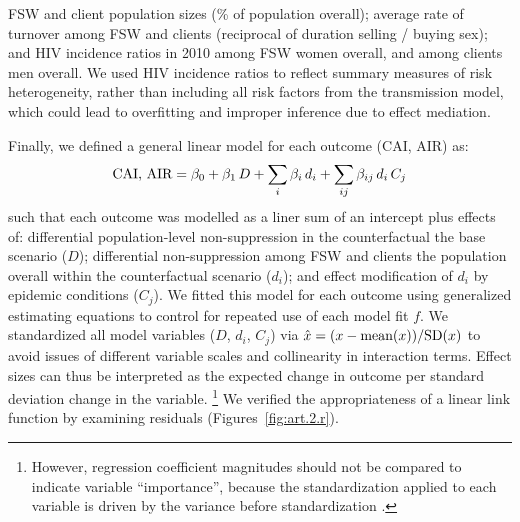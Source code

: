 FSW and client population sizes (\% of population overall);
average rate of turnover among FSW and clients (reciprocal of duration selling / buying sex); and
HIV incidence ratios in 2010 among FSW \vs women overall, and among clients \vs men overall.
We used HIV incidence ratios to reflect summary measures of risk heterogeneity,
rather than including all risk factors from the transmission model,
which could lead to overfitting and improper inference due to effect mediation.
\par
Finally, we defined a general linear model for each outcome (CAI, AIR) as:
\begin{equation}\label{eq:art.2.glm}
  \textnormal{CAI, AIR} = \beta_0
                 + \beta_1\,D
                 + \sum_i \beta_i\,d_i
                 + \sum_{ij} \beta_{ij}\,d_i\,C_j
\end{equation}
such that each outcome was modelled as a liner sum of an intercept plus effects of:
differential population-level non-suppression in the counterfactual \vs the base scenario ($D$);
differential non-suppression among FSW and clients
\vs the population overall within the counterfactual scenario ($d_i$); and
effect modification of $d_i$ by epidemic conditions ($C_j$).
We fitted this model for each outcome using generalized estimating equations \cite{Hojsgaard2006}
to control for repeated use of each model fit $f$.
We standardized all model variables ($D$, $d_i$, $C_j$) via
$\hat{x} = (x - \textnormal{mean}(x)) / \textnormal{SD}(x)$
to avoid issues of different variable scales and collinearity in interaction terms.
Effect sizes can thus be interpreted as
the expected change in outcome per standard deviation change in the variable.%
\footnote{However, regression coefficient magnitudes
  should not be compared to indicate variable ``importance'',
  because the standardization applied to each variable
  is driven by the variance before standardization \cite{Rajerison2012}.}
We verified the appropriateness of a linear link function by examining residuals
(Figures~\ref{fig:art.2.r}).
